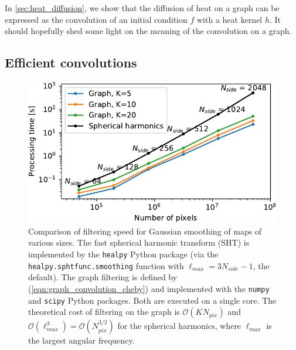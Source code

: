 \documentclass[final,twocolumn,3p,times,authoryear]{elsarticle}
\newcommand{\eqnref}[1]{(\ref{eqn:#1})}
\newcommand{\1}{\b{1}}              %
\newcommand{\0}{\b{0}}              %
\newcommand{\bO}{\mathcal{O}}
\begin{document}
In \ref{sec:heat_diffusion}, we show that the diffusion of heat on a graph can be expressed as the convolution of an initial condition $f$ with a heat kernel $h$. It should hopefully shed some light on the meaning of the convolution on a graph.

\subsection{Efficient convolutions}
\label{sec:efficient_convolution}

\begin{figure}
    \centering
    \includegraphics[width=\linewidth]{filtering_speed}
    \caption{Comparison of filtering speed for Gaussian smoothing of maps of various sizes.
    The fast spherical harmonic transform (SHT) is implemented by the \texttt{healpy} Python package (via the \texttt{healpy.sphtfunc.smoothing} function with $\ell_{max} = 3 N_{side} - 1$, the default).
    The graph filtering is defined by \eqnref{graph_convolution_cheby} and implemented with the \texttt{numpy} and \texttt{scipy} Python packages.
    Both are executed on a single core.
	The theoretical cost of filtering on the graph is $\bO(K N_{pix})$ and $\bO(\ell_{max}^3) = \bO(N_{pix}^{3/2})$ for the spherical harmonics, where $\ell_{max}$ is the largest angular frequency.}
    \label{fig:filtering_speed}
\end{figure}
\end{document}

